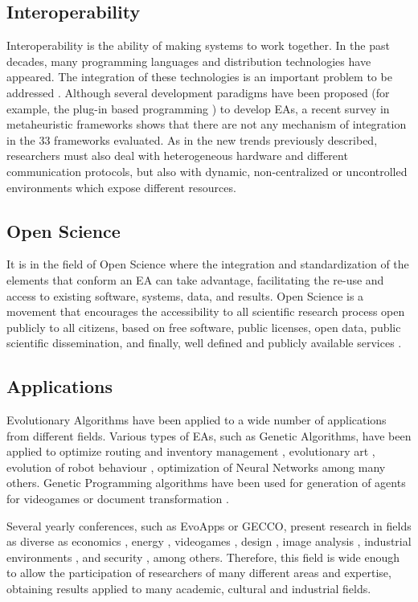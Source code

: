 \subsection{Interoperability}
Interoperability is the ability of making systems to work together. In the past decades, many programming languages and distribution technologies have  appeared. The integration of these technologies is an important problem to be addressed  \cite{Papazoglou2007SOA}. Although several development paradigms have been proposed (for example, the plug-in based programming \cite{WagnerPlugins07}) to develop EAs, a recent survey in metaheuristic frameworks \cite{SURVEYMOFS} shows that there are not any mechanism of integration in the 33 frameworks evaluated. As in the new trends previously described, researchers  must also deal  with heterogeneous hardware and different communication protocols, but also with dynamic, non-centralized or uncontrolled environments which expose different resources.

\subsection{Open Science}
It is in the field of Open Science \cite{Altunay2011OpenScience} where the integration and standardization of
the elements that conform an EA can take advantage, facilitating the re-use and access to existing software, systems, data, and results. Open Science is a movement that encourages the accessibility to all scientific research process open publicly to all citizens, based on free software, public licenses, open data, public scientific dissemination, and finally, well defined and publicly available services \cite{Foster2005Science}.


\subsection{Applications}
Evolutionary Algorithms have been applied to a wide number of applications from different fields. Various types of EAs, such as Genetic Algorithms, have been applied to optimize routing and inventory management \cite{Esparcia2009EVITA}, evolutionary art \cite{Garcia2013RGB}, evolution of robot behaviour \cite{Garcia2012testing}, optimization of Neural Networks \cite{Castillo1999gprop} among many others. Genetic Programming algorithms have been used for generation of agents for videogames \cite{Esparcia2013GPunreal} or document transformation \cite{Garcia2008XSLT}. 

Several yearly conferences, such as EvoApps or GECCO, %
present research in fields as diverse as economics \cite{Kampouridis13financial}, energy \cite{HuttererEnergy13},
videogames \cite{Mora2012Genebot}, design \cite{DorinDesign13}, image analysis \cite{AmelioImage13}, industrial environments \cite{Li13Industry}, and
security \cite{Harmer11Security}, among others. Therefore, this field is wide enough to allow
the participation of researchers of many different areas and
expertise, obtaining results applied to many academic, cultural and industrial fields. %







